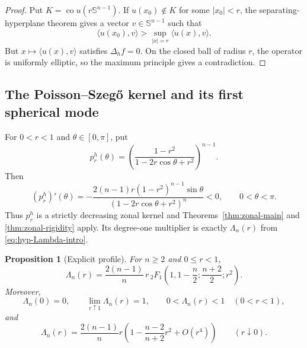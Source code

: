 \documentclass[11pt,reqno]{amsart}
\newtheorem{proposition}[theorem]{Proposition}
\theoremstyle{remark}
\newcommand{\Sph}{\mathbb S}
\newcommand{\co}{\operatorname{co}}
\newcommand{\Dh}{\Delta_h}
\begin{document}
\begin{proof}
Put $K=\co u(r\Sph^{n-1})$. If $u(x_0)\notin K$ for some $|x_0|<r$, the separating-hyperplane theorem gives a vector $v\in\Sph^{n-1}$ such that
\[
 \langle u(x_0),v\rangle>
 \sup_{|x|=r}\langle u(x),v\rangle.
\]
But $x\mapsto\langle u(x),v\rangle$ satisfies $\Dh f=0$. On the closed ball of radius $r$, the operator is uniformly elliptic, so the maximum principle gives a contradiction.
\end{proof}


\subsection{The Poisson--Szeg\H{o} kernel and its first spherical mode}
For $0<r<1$ and $\theta\in[0,\pi]$, put
\begin{equation}\label{hyp:eq:prh-merged}
 p_r^h(\theta)=\left(\frac{1-r^2}{1-2r\cos\theta+r^2}\right)^{n-1}.
\end{equation}
Then
\[
 (p_r^h)'(\theta)
 =-\frac{2(n-1)r(1-r^2)^{n-1}\sin\theta}
 {(1-2r\cos\theta+r^2)^n}<0,
 \qquad 0<\theta<\pi.
\]
Thus $p_r^h$ is a strictly decreasing zonal kernel and Theorems~\ref{thm:zonal-main} and \ref{thm:zonal-rigidity} apply. Its degree-one multiplier is exactly $\Lambda_n(r)$ from \eqref{eq:hyp-Lambda-intro}.

\begin{proposition}[Explicit profile]\label{hyp:prop:Lambda}
For $n\ge2$ and $0\le r<1$,
\begin{equation}\label{hyp:eq:Lambda-explicit}
 \Lambda_n(r)=\frac{2(n-1)}{n}\,r\,
 {}_2F_1\!\left(1,1-\frac n2;\frac{n+2}{2};r^2\right).
\end{equation}
Moreover,
\begin{equation}\label{hyp:eq:Lambda-endpoints}
 \Lambda_n(0)=0,
 \qquad
 \lim_{r\uparrow1}\Lambda_n(r)=1,
 \qquad
 0<\Lambda_n(r)<1\quad(0<r<1),
\end{equation}
and
\begin{equation}\label{hyp:eq:Lambda-expansion}
 \Lambda_n(r)
 =\frac{2(n-1)}{n}r
 \left(1-\frac{n-2}{n+2}r^2+O(r^4)\right)
 \qquad(r\downarrow0).
\end{equation}
\end{proposition}
\end{document}

